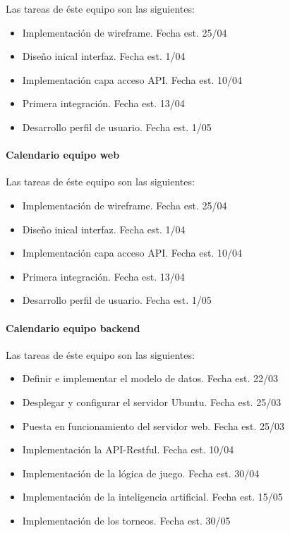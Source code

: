 \documentclass{article}
\begin{document}
Las tareas de éste equipo son las siguientes:
\begin{itemize}

    \item Implementación de wireframe. Fecha est. 25/04
    \item Diseño inical interfaz. Fecha est. 1/04
    \item Implementación capa acceso API. Fecha est. 10/04
    \item Primera integración. Fecha est. 13/04
    \item Desarrollo perfil de usuario. Fecha est. 1/05
\end{itemize}

\paragraph{Calendario equipo web}

Las tareas de éste equipo son las siguientes:
\begin{itemize}

    \item Implementación de wireframe. Fecha est. 25/04
    \item Diseño inical interfaz. Fecha est. 1/04
    \item Implementación capa acceso API. Fecha est. 10/04
    \item Primera integración. Fecha est. 13/04
    \item Desarrollo perfil de usuario. Fecha est. 1/05
\end{itemize}
\paragraph{Calendario equipo backend}


Las tareas de éste equipo son las siguientes:
\begin{itemize}
    \item Definir e implementar el modelo de datos. Fecha est. 22/03
    \item Desplegar y configurar el servidor Ubuntu. Fecha est. 25/03
    \item Puesta en funcionamiento del servidor web. Fecha est. 25/03
    \item Implementación la API-Restful. Fecha est. 10/04
    \item Implementación de la lógica de juego. Fecha est. 30/04
    \item Implementación de la inteligencia artificial. Fecha est. 15/05
    \item Implementación de los torneos. Fecha est. 30/05
\end{itemize}
\end{document}
